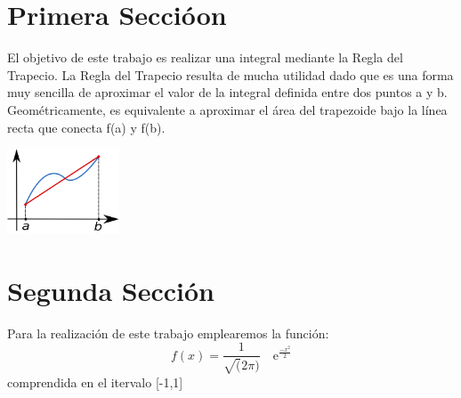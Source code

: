 

\section{Primera Seccióon}
\label{1:sec:1}
\parindent=0.5cm
\raggedright
El objetivo de este trabajo es realizar una integral mediante la Regla del Trapecio. La Regla
del Trapecio resulta de mucha utilidad dado que es una forma muy sencilla de aproximar el valor de
la integral definida entre dos puntos a y b. Geométricamente, es equivalente a aproximar el área del 
trapezoide bajo la línea recta que conecta f(a) y f(b).
\begin{center}
\includegraphics[width=0.25\textwidth]{images/Regla-Trapecio.eps}
\end{center}

\section{Segunda Sección}
\label{1:sec:2}
\parindent=0.5cm
\raggedright
Para la realización de este trabajo emplearemos la función:
\[
  f(x)=\frac{1}{\sqrt(2\pi)} \quad\text{e}^{\frac{-x^2}{2}}
\]
comprendida en el itervalo [-1,1]
